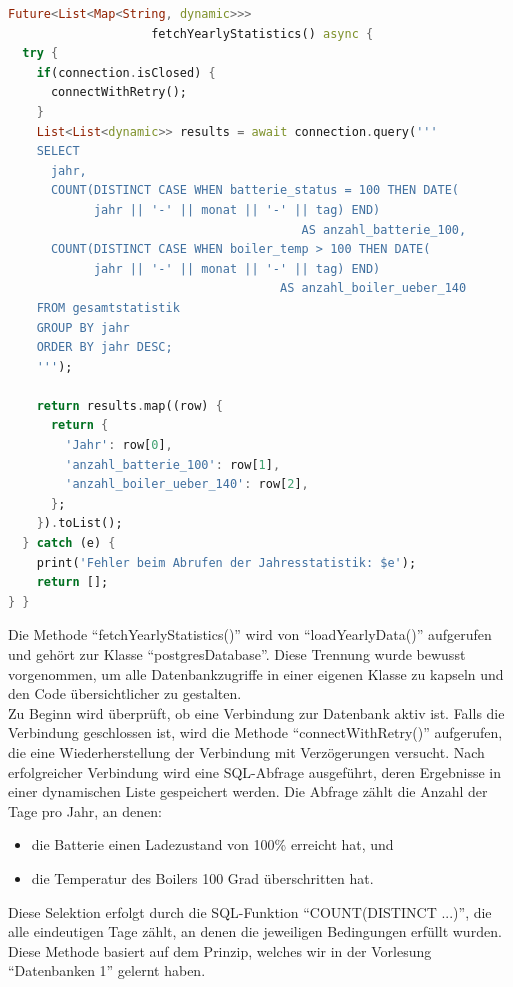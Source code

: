\documentclass[11pt]{scrartcl}
\begin{document}
    \begin{lstlisting}[language=Dart]
Future<List<Map<String, dynamic>>>
                    fetchYearlyStatistics() async {
  try {
    if(connection.isClosed) {
      connectWithRetry();
    }
    List<List<dynamic>> results = await connection.query('''
    SELECT
      jahr,
      COUNT(DISTINCT CASE WHEN batterie_status = 100 THEN DATE(
            jahr || '-' || monat || '-' || tag) END)
                                         AS anzahl_batterie_100,
      COUNT(DISTINCT CASE WHEN boiler_temp > 100 THEN DATE(
            jahr || '-' || monat || '-' || tag) END)
                                      AS anzahl_boiler_ueber_140
    FROM gesamtstatistik
    GROUP BY jahr
    ORDER BY jahr DESC;
    ''');

    return results.map((row) {
      return {
        'Jahr': row[0],
        'anzahl_batterie_100': row[1],
        'anzahl_boiler_ueber_140': row[2],
      };
    }).toList();
  } catch (e) {
    print('Fehler beim Abrufen der Jahresstatistik: $e');
    return [];
} }
    \end{lstlisting}
    Die Methode \enquote{fetchYearlyStatistics()} wird von \enquote{loadYearlyData()} aufgerufen und gehört zur Klasse
    \enquote{postgresDatabase}.
    Diese Trennung wurde bewusst vorgenommen, um alle Datenbankzugriffe in einer eigenen Klasse zu kapseln und
    den Code übersichtlicher zu gestalten.  \\
    Zu Beginn wird überprüft, ob eine Verbindung zur Datenbank aktiv ist.
    Falls die Verbindung geschlossen ist, wird die Methode \enquote{connectWithRetry()} aufgerufen, die eine Wiederherstellung der
    Verbindung mit Verzögerungen versucht.
    Nach erfolgreicher Verbindung wird eine SQL-Abfrage ausgeführt, deren Ergebnisse in einer dynamischen Liste
    gespeichert werden.
    Die Abfrage zählt die Anzahl der Tage pro Jahr, an denen:
    \begin{itemize}
        \item die Batterie einen Ladezustand von 100\% erreicht hat, und
        \item die Temperatur des Boilers 100 Grad überschritten hat.
    \end{itemize}
    Diese Selektion erfolgt durch die SQL-Funktion \enquote{COUNT(DISTINCT ...)}, die alle eindeutigen Tage zählt, an
    denen die jeweiligen Bedingungen erfüllt wurden.
    Diese Methode basiert auf dem Prinzip, welches wir in der Vorlesung \enquote{Datenbanken 1} gelernt haben.
\end{document}

